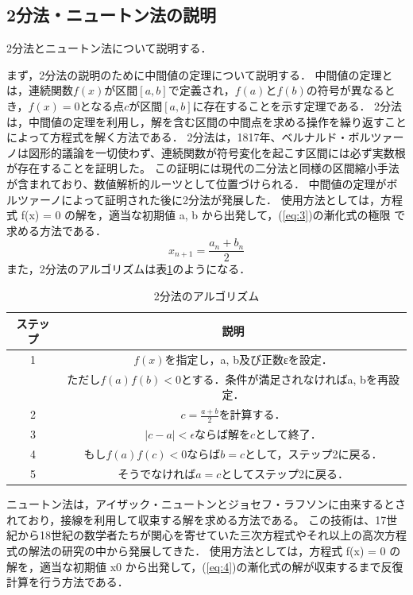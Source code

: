 \documentclass[uplatex]{jsarticle}
\begin{document}
\subsection{2分法・ニュートン法の説明}
\indent
2分法とニュートン法について説明する．
\par
まず，2分法の説明のために中間値の定理について説明する．
中間値の定理とは，連続関数$f(x)$が区間$[a,b]$で定義され，$f(a)$と$f(b)$の符号が異なるとき，$f(x)=0$となる点$c$が区間$[a,b]$に存在することを示す定理である．
2分法は，中間値の定理を利用し，解を含む区間の中間点を求める操作を繰り返すことによって方程式を解く方法である．
2分法は，1817年、ベルナルド・ボルツァーノは図形的議論を一切使わず、連続関数が符号変化を起こす区間には必ず実数根が存在することを証明した。
この証明には現代の二分法と同様の区間縮小手法が含まれており、数値解析的ルーツとして位置づけられる．
中間値の定理がボルツァーノによって証明された後に2分法が発展した\cite{ref4}．
使用方法としては，方程式 f(x) = 0 の解を，適当な初期値 a, b から出発して，(\ref{eq:3})の漸化式の極限
で求める方法である\cite{ref5}．
\begin{equation}
x_{n+1} = \frac{a_n + b_n}{2}\label{eq:3}
\end{equation}
また，2分法のアルゴリズムは表\ref{tab:1}のようになる．
\begin{table}[H]
	\centering
	\caption{2分法のアルゴリズム}
	\begin{tabular}{|c|c|}
		\hline
		\textbf{ステップ} & \textbf{説明} \\
		\hline
		1 & $f(x)$を指定し，a, b及び正数εを設定．\\
		& ただし$f(a)f(b)<0$とする．条件が満足されなければa, bを再設定．\\
		\hline
		2 & $c = \frac{a+b}{2}$を計算する． \\
		\hline
		3 & $|c-a|<\epsilon$ならば解を$c$として終了． \\
		\hline
		4 & もし$f(a)f(c)<0$ならば$b=c$として，ステップ2に戻る． \\
		\hline
		5 & そうでなければ$a=c$としてステップ2に戻る． \\
		\hline
	\end{tabular}
	\label{tab:1}
\end{table}
\indent
ニュートン法は，アイザック・ニュートンとジョセフ・ラフソンに由来するとされており，接線を利用して収束する解を求める方法である。
この技術は、17世紀から18世紀の数学者たちが関心を寄せていた三次方程式やそれ以上の高次方程式の解法の研究の中から発展してきた\cite{ref6}．
使用方法としては，方程式 f(x) = 0 の解を，適当な初期値 x0 から出発して，(\ref{eq:4})の漸化式の解が収束するまで反復計算を行う方法である．
\end{document}
